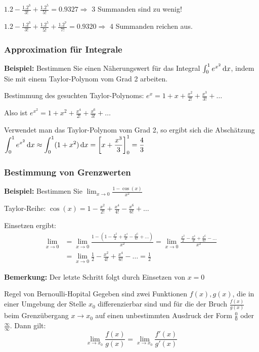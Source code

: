 $1.2 - \frac{1.2^3}{3!} + \frac{1.2^5}{5!} = 0.9327 \Rightarrow$ 3 Summanden sind zu wenig!

$1.2 - \frac{1.2^3}{3!} + \frac{1.2^5}{5!} + \frac{1.2^7}{7!} = 0.9320 \Rightarrow$ 4 Summanden reichen aus.

\subsubsection{Approximation für Integrale}

\textbf{Beispiel:} Bestimmen Sie einen Näherungswert für das Integral $\int_{0}^{1} e^{x^2} \,\mathrm{d}x$, indem Sie mit einem Taylor-Polynom vom Grad 2 arbeiten.

Bestimmung des gesuchten Taylor-Polynoms: $e^x = 1 + x + \frac{x^2}{2!} + \frac{x^3}{3!} + \dots$

Also ist $e^{x^2} = 1 + x^2 + \frac{x^4}{2!} + \frac{x^6}{3!} + \dots$

Verwendet man das Taylor-Polynom vom Grad 2, so ergibt sich die Abschätzung $\displaystyle \int_{0}^{1} e^{x^2} \,\mathrm{d}x \approx \int_{0}^{1} (1 + x^2) \,\mathrm{d}x = \left[ x + \frac{x^3}{3} \right]_{0}^{1} = \frac{4}{3}$

\subsubsection{Bestimmung von Grenzwerten}

\textbf{Beispiel:} Bestimmen Sie $\lim_{x \rightarrow 0} \frac{1 - \cos(x)}{x^2}$

Taylor-Reihe: $\cos(x) = 1 - \frac{x^2}{2!} + \frac{x^4}{4!} - \frac{x^6}{6!} + \dots$

Einsetzen ergibt:
\begin{align*}
    \lim_{x \rightarrow 0} &= \lim_{x \rightarrow 0} \frac{1 - (1 - \frac{x^2}{2} + \frac{x^4}{4!} - \frac{x^6}{6!} + \dots)}{x^2} = \lim_{x \rightarrow 0} \frac{ \frac{x^2}{2} - \frac{x^4}{4!} + \frac{x^6}{6!} - \dots}{x^2} \\
    &= \lim_{x \rightarrow 0} \frac{1}{2} - \frac{x^2}{4!} + \frac{x^4}{6!} - \dots = \frac{1}{2}
\end{align*}

\textbf{Bemerkung:} Der letzte Schritt folgt durch Einsetzen von $x=0$

\begin{definition}{Regel von Bernoulli-Hopital}
    Gegeben sind zwei Funktionen $f(x), g(x)$, die in einer Umgebung der Stelle $x_0$ differenzierbar sind und für die der Bruch $\frac{f(x)}{g(x)}$ beim Grenzübergang $x \to x_0$ auf einen unbestimmten Ausdruck der Form $\frac{0}{0}$ oder $\frac{\infty}{\infty}$.
    Dann gilt: \[\lim \limits_{x \to x_0} \frac{f(x)}{g(x)} = \lim \limits_{x \to x_0} \frac{f'(x)}{g'(x)}\]
\end{definition}